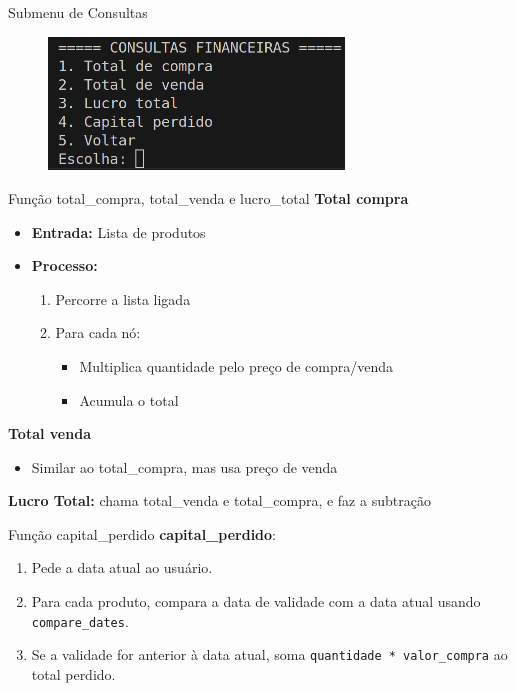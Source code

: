 \documentclass{beamer}
\begin{document}
\begin{frame}{Submenu de Consultas}
    \begin{figure}
        \centering
        \includegraphics[width=0.7\textwidth]{img/consulta-1.png}
    \end{figure}
\end{frame}

\begin{frame}{Função total\_compra, total\_venda e lucro\_total}
    \textbf{Total compra}
    \begin{itemize}
        \item \textbf{Entrada:} Lista de produtos
        \item \textbf{Processo:}
        \begin{enumerate}
            \item Percorre a lista ligada
            \item Para cada nó:
            \begin{itemize}
                \item Multiplica quantidade pelo preço de compra/venda
                \item Acumula o total
            \end{itemize}
        \end{enumerate}
    \end{itemize}

    \textbf{Total venda}
    \begin{itemize}
        \item Similar ao total\_compra, mas usa preço de venda
    \end{itemize}


    \textbf{Lucro Total:} chama total\_venda e total\_compra, e faz a subtração
\end{frame}

\begin{frame}{Função capital\_perdido}
    \textbf{capital\_perdido}:
    \begin{enumerate}
        \item Pede a data atual ao usuário.
        \item Para cada produto, compara a data de validade com a data atual usando \texttt{compare\_dates}.
        \item Se a validade for anterior à data atual, soma \texttt{quantidade * valor\_compra} ao total perdido.
    \end{enumerate}
\end{frame}
\end{document}
